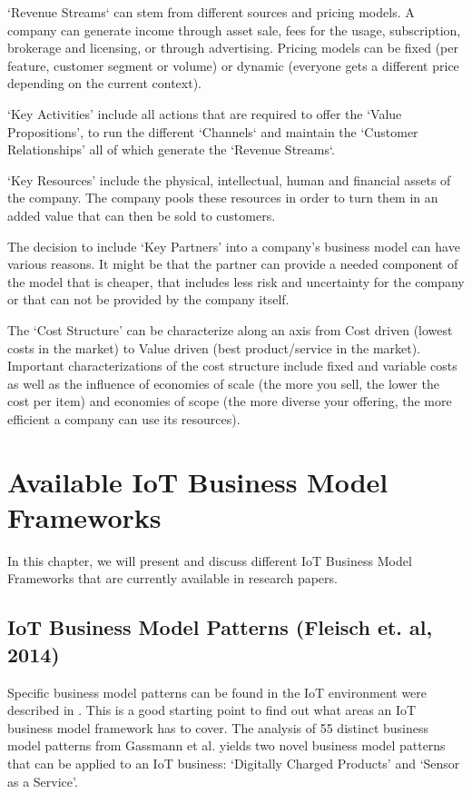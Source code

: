 		`Revenue Streams` can stem from different sources and pricing models. A company can generate income through asset sale, fees for the usage, subscription, brokerage and licensing, or through advertising. Pricing models can be fixed (per feature, customer segment or volume) or dynamic (everyone gets a different price depending on the current context).
 
		`Key Activities' include all actions that are required to offer the `Value Propositions', to run the different `Channels` and maintain the `Customer Relationships' all of which generate the `Revenue Streams`.

		`Key Resources' include the physical, intellectual, human and financial assets of the company. The company pools these resources in order to turn them in an added value that can then be sold to customers.

		The decision to include `Key Partners' into a company's business model can have various reasons. It might be that the partner can provide a needed component of the model that is cheaper, that includes less risk and uncertainty for the company or that can not be provided by the company itself.

		The `Cost Structure' can be characterize along an axis from Cost driven (lowest costs in the market) to Value driven (best product/service in the market). Important characterizations of the cost structure include fixed and variable costs as well as the influence of economies of scale (the more you sell, the lower the cost per item) and economies of scope (the more diverse your offering, the more efficient a company can use its resources).	

\section{Available IoT Business Model Frameworks}
\label{sec:bmf_available}
	In this chapter, we will present and discuss different IoT Business Model Frameworks that are currently available in research papers.
	\subsection{IoT Business Model Patterns (Fleisch et. al, 2014)}
		Specific business model patterns can be found in the IoT environment were described in \cite{fleisch}. This is a good starting point to find out what areas an IoT business model framework has to cover. The analysis of 55 distinct business model patterns from Gassmann et al. \cite{gassmann55} yields two novel business model patterns that can be applied to an IoT business: `Digitally Charged Products' and `Sensor as a Service'.

